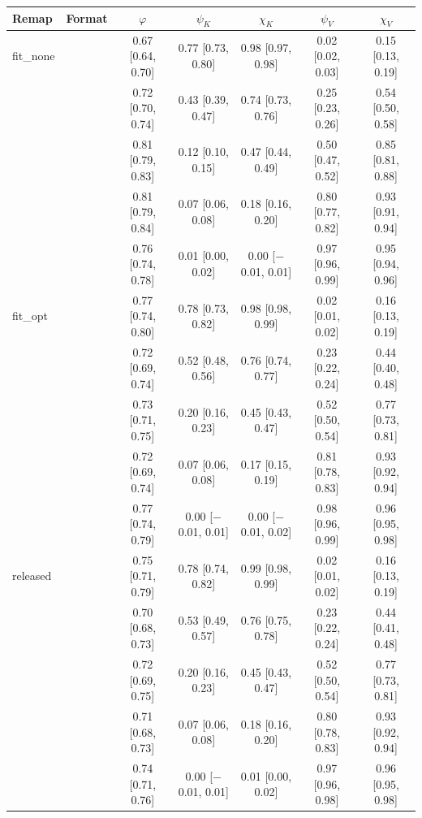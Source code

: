 \begin{tabular}{llccccc}
\toprule
Remap & Format & $\varphi$ & $\psi_K$ & $\chi_K$ & $\psi_V$ & $\chi_V$ \\
\midrule
fit\_none & \fmtLetter{} & 0.67 [0.64, 0.70] & 0.77 [0.73, 0.80] & 0.98 [0.97, 0.98] & 0.02 [0.02, 0.03] & 0.15 [0.13, 0.19] \\
 & \fmtOpt{} & 0.72 [0.70, 0.74] & 0.43 [0.39, 0.47] & 0.74 [0.73, 0.76] & 0.25 [0.23, 0.26] & 0.54 [0.50, 0.58] \\
 & \fmtPost{} & 0.81 [0.79, 0.83] & 0.12 [0.10, 0.15] & 0.47 [0.44, 0.49] & 0.50 [0.47, 0.52] & 0.85 [0.81, 0.88] \\
 & \fmtNone{} & 0.81 [0.79, 0.84] & 0.07 [0.06, 0.08] & 0.18 [0.16, 0.20] & 0.80 [0.77, 0.82] & 0.93 [0.91, 0.94] \\
 & \fmtBefore{} & 0.76 [0.74, 0.78] & 0.01 [0.00, 0.02] & 0.00 [$-$0.01, 0.01] & 0.97 [0.96, 0.99] & 0.95 [0.94, 0.96] \\
\midrule
fit\_opt & \fmtLetter{} & 0.77 [0.74, 0.80] & 0.78 [0.73, 0.82] & 0.98 [0.98, 0.99] & 0.02 [0.01, 0.02] & 0.16 [0.13, 0.19] \\
 & \fmtOpt{} & 0.72 [0.69, 0.74] & 0.52 [0.48, 0.56] & 0.76 [0.74, 0.77] & 0.23 [0.22, 0.24] & 0.44 [0.40, 0.48] \\
 & \fmtPost{} & 0.73 [0.71, 0.75] & 0.20 [0.16, 0.23] & 0.45 [0.43, 0.47] & 0.52 [0.50, 0.54] & 0.77 [0.73, 0.81] \\
 & \fmtNone{} & 0.72 [0.69, 0.74] & 0.07 [0.06, 0.08] & 0.17 [0.15, 0.19] & 0.81 [0.78, 0.83] & 0.93 [0.92, 0.94] \\
 & \fmtBefore{} & 0.77 [0.74, 0.79] & 0.00 [$-$0.01, 0.01] & 0.00 [$-$0.01, 0.02] & 0.98 [0.96, 0.99] & 0.96 [0.95, 0.98] \\
\midrule
released & \fmtLetter{} & 0.75 [0.71, 0.79] & 0.78 [0.74, 0.82] & 0.99 [0.98, 0.99] & 0.02 [0.01, 0.02] & 0.16 [0.13, 0.19] \\
 & \fmtOpt{} & 0.70 [0.68, 0.73] & 0.53 [0.49, 0.57] & 0.76 [0.75, 0.78] & 0.23 [0.22, 0.24] & 0.44 [0.41, 0.48] \\
 & \fmtPost{} & 0.72 [0.69, 0.75] & 0.20 [0.16, 0.23] & 0.45 [0.43, 0.47] & 0.52 [0.50, 0.54] & 0.77 [0.73, 0.81] \\
 & \fmtNone{} & 0.71 [0.68, 0.73] & 0.07 [0.06, 0.08] & 0.18 [0.16, 0.20] & 0.80 [0.78, 0.83] & 0.93 [0.92, 0.94] \\
 & \fmtBefore{} & 0.74 [0.71, 0.76] & 0.00 [$-$0.01, 0.01] & 0.01 [0.00, 0.02] & 0.97 [0.96, 0.98] & 0.96 [0.95, 0.98] \\
\bottomrule
\end{tabular}

